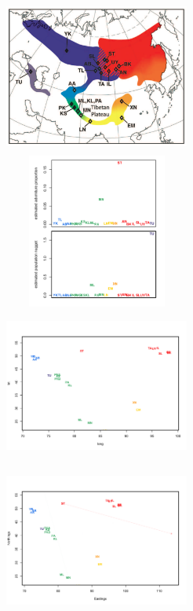 \documentclass[12pt]{article}
\begin{document}
\begin{figure}
	\centering
			{\includegraphics[width=2.4in,height=2in]{figs/warblers/Irwin_warbler_map_figure.png}}
			{\includegraphics[width=2.4in,height=2in]{figs/warblers/population_warbler_admix_values_nugget.png}}
			{\includegraphics[width=2.4in,height=2in]{figs/warblers/population_warbler_map_no_arrows.png}}
			{\includegraphics[width=2.4in,height=2in]{figs/warblers/population_warbler_map_randpr1.png}}

\end{figure}
\end{document}
